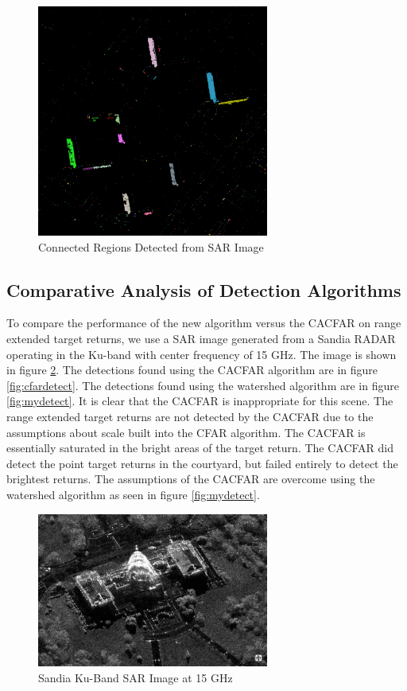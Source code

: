 \documentclass[journal]{IEEEtran}
\begin{document}
\begin{figure}[!h]
\centering
\includegraphics[width=3.0in]{../images/starlite_detections.png}
\caption{Connected Regions Detected from SAR Image}
\label{fig:starlite_detections}
\end{figure}


\subsection{Comparative Analysis of Detection Algorithms}
\par To compare the performance of the new algorithm versus the CACFAR on range extended target returns, we use a SAR image generated from a Sandia RADAR operating in the Ku-band with center frequency of 15 GHz. The image is shown in figure \ref{fig:sandia}. The detections found using the CACFAR algorithm are in figure \ref{fig:cfardetect}. The detections found using the watershed algorithm are in figure \ref{fig:mydetect}. It is clear that the CACFAR is inappropriate for this scene. The range extended target returns are not detected by the CACFAR due to the assumptions about scale built into the CFAR algorithm. The CACFAR is essentially saturated in the bright areas of the target return. The CACFAR did detect the point target returns in the courtyard, but failed entirely to detect the brightest returns. The assumptions of the CACFAR are overcome using the watershed algorithm as seen in figure \ref{fig:mydetect}.

\begin{figure}[!h]
\centering
\includegraphics[width=3.0in]{../images/capitol.png}
\caption{Sandia Ku-Band SAR Image at 15 GHz}
\label{fig:sandia}
\end{figure}
\end{document}
